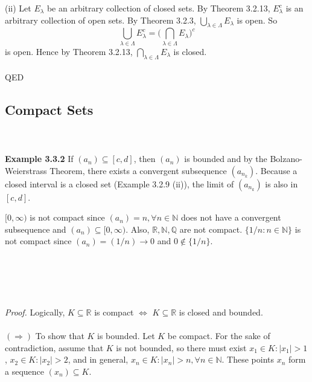 \documentclass{article}
\begin{document}
            (ii) Let $E_\lambda$ be an arbitrary collection of closed sets. By Theorem 3.2.13, $E^c_\lambda$ is an arbitrary collection of open sets. By Theorem 3.2.3, $\bigcup_{\lambda \in \Lambda} E_\lambda$ is open. So
            \begin{equation*}
                \bigcup_{\lambda \in \Lambda} E^c_\lambda = \Bigg( \bigcap_{\lambda \in \Lambda} E_\lambda \Bigg)^c
            \end{equation*}
            is open. Hence by Theorem 3.2.13, $\bigcap_{\lambda \in \Lambda} E_\lambda$ is closed.\\ \\
            QED
            
            \subsection{Compact Sets}
            \\ \\
            \textbf{Example 3.3.2} If $(a_n) \subseteq [c,d]$, then $(a_n)$ is bounded and by the Bolzano-Weierstrass Theorem, there exists a convergent subsequence $(a_{n_k})$. Because a closed interval is a closed set (Example 3.2.9 (ii)), the limit of $(a_{n_k})$ is also in $[c,d]$.
            
            $[0,\infty)$ is not compact since $(a_n)=n, \forall n \in \mathbb{N}$ does not have a convergent subsequence and $(a_n) \subseteq [0,\infty)$. Also, $\mathbb{R}, \mathbb{N}, \mathbb{Q}$ are not compact. $\{1/n: n \in \mathbb{N}\}$ is not compact since $(a_n) = (1/n) \to 0$ and $0 \notin \{1/n\}$.
            \\ \\
            \\ \\
            \\ \\
            \textit{Proof.} Logically, $K \subseteq \mathbb{R}$ is compact $\iff$ $K \subseteq \mathbb{R}$ is closed and bounded.
            \\ \\
            $(\Rightarrow)$ To show that $K$ is bounded. Let $K$ be compact. For the sake of contradiction, assume that $K$ is not bounded, so there must exist $x_1 \in K: |x_1| > 1$, $x_2 \in K: |x_2| > 2$, and in general, $x_n \in K: |x_n| > n, \forall n \in \mathbb{N}$. These points $x_n$ form a sequence $(x_n) \subseteq K$.
            
\end{document}
